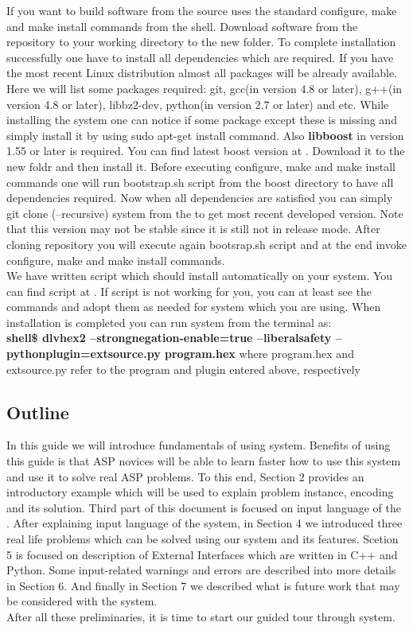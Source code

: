 \documentclass[14pt,a4paper, titlepage]{article}
\begin{document}
If you want to build software from the source \dlvhex{} uses the standard configure, make and make install commands from the shell. Download software from the repository to your working directory to the new folder. To complete installation successfully one have to install all dependencies which are required. If you have the most recent Linux distribution almost all packages will be already available. Here we will list some packages required: git, gcc(in version 4.8 or later), g++(in version 4.8 or later), libbz2-dev, python(in version 2.7 or later) and etc. While installing the system one can notice if some package except these is missing and simply install it by using sudo apt-get install command. Also \textbf{libboost} in version 1.55 or later is required. You can find latest boost version at \cite{boost}. Download it to the new foldr and then install it. Before executing configure, make and make install commands one will run bootstrap.sh script from the boost directory to have all dependencies required. Now when all dependencies are satisfied you can simply git clone (--recursive) system from the \cite{hexhex} to get most recent developed version. Note that this version may not be stable since it is still not in release mode. After cloning repository you will execute again bootsrap.sh script and at the end invoke configure, make and make install commands.\bigskip \\We have written script which should install \dlvhex{} automatically on your system. You can find script at \cite{script}. If script is not working for you, you can at least see the commands and adopt them as needed for system which you are using. When installation is completed you can run system from the terminal as:\\ 
\textbf{shell\$ dlvhex2 --strongnegation-enable=true --liberalsafety --pythonplugin=extsource.py program.hex}
where program.hex and extsource.py refer to the program and plugin entered above, respectively    

\subsection{Outline}
In this guide we will introduce fundamentals of using \dlvhex{} system. Benefits of using this guide is that ASP novices will be able to learn faster how to use this system and use it to solve real ASP problems. To this end, Section 2 provides an introductory example which will be used to explain problem instance, encoding and its solution. Third part of this document is focused on input language of the \dlvhex{}. After explaining input language of the system, in Section 4 we introduced three real life problems which can be solved using our system and its features. Scetion 5 is focused on description of External Interfaces which are written in C++ and Python. Some input-related warnings and errors are described into more details in Section 6. And finally in Section 7 we described what is future work that may be considered with the system. \bigskip \\After all these preliminaries, it is time to start our guided tour through \dlvhex{} system.      
\end{document}
